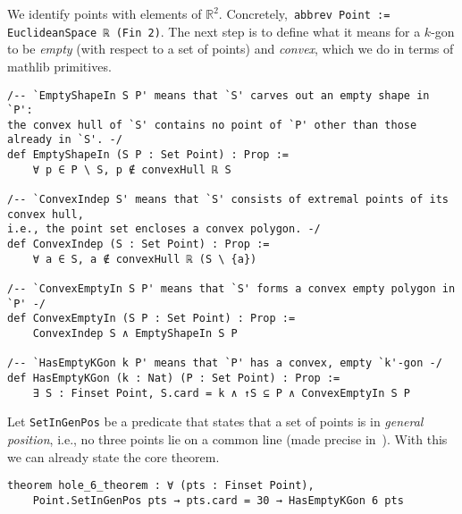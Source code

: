 We identify points with elements of $\mathbb{R}^2$. Concretely,~\lstinline|abbrev Point := EuclideanSpace ℝ (Fin 2)|.
The next step is to define what it means for a $k$-gon to be \emph{empty} (with respect to a set of points) and \emph{convex}, which we do in terms of \textsf{mathlib} primitives.

\begin{lstlisting}
/-- `EmptyShapeIn S P' means that `S' carves out an empty shape in `P':
the convex hull of `S' contains no point of `P' other than those already in `S'. -/
def EmptyShapeIn (S P : Set Point) : Prop :=
    ∀ p ∈ P \ S, p ∉ convexHull ℝ S

/-- `ConvexIndep S' means that `S' consists of extremal points of its convex hull,
i.e., the point set encloses a convex polygon. -/
def ConvexIndep (S : Set Point) : Prop :=
    ∀ a ∈ S, a ∉ convexHull ℝ (S \ {a})

/-- `ConvexEmptyIn S P' means that `S' forms a convex empty polygon in `P' -/
def ConvexEmptyIn (S P : Set Point) : Prop :=
    ConvexIndep S ∧ EmptyShapeIn S P

/-- `HasEmptyKGon k P' means that `P' has a convex, empty `k'-gon -/
def HasEmptyKGon (k : Nat) (P : Set Point) : Prop :=
    ∃ S : Finset Point, S.card = k ∧ ↑S ⊆ P ∧ ConvexEmptyIn S P
\end{lstlisting}

Let \lstinline|SetInGenPos| be a predicate that states that a set of points is in \emph{general position}, i.e., no three points lie on a common line (made precise in~).
With this we can already state the core theorem.

\begin{lstlisting}
theorem hole_6_theorem : ∀ (pts : Finset Point),
    Point.SetInGenPos pts → pts.card = 30 → HasEmptyKGon 6 pts
\end{lstlisting}


